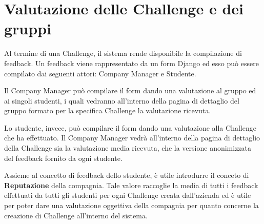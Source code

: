 \section{Valutazione delle Challenge e dei gruppi}
\label{sec:valutazioni}

Al termine di una Challenge, il sistema rende disponibile la compilazione di feedback. Un feedback viene rappresentato da un form Django ed esso può essere compilato dai seguenti attori: Company Manager e Studente. 

Il Company Manager può compilare il form dando una valutazione al gruppo ed ai singoli studenti, i quali vedranno all'interno della pagina di dettaglio del gruppo formato per la specifica Challenge la valutazione ricevuta.

Lo studente, invece, può compilare il form dando una valutazione alla Challenge che ha effettuato. Il Company Manager vedrà all'interno della pagina di dettaglio della Challenge sia la valutazione media ricevuta, che la versione anonimizzata del feedback fornito da ogni studente. 

Assieme al concetto di feedback dello studente, è utile introdurre il conceto di \textbf{Reputazione} della compagnia. Tale valore raccoglie la media di tutti i feedback effettuati da tutti gli studenti per ogni Challenge creata dall'azienda ed è utile per poter dare una valutazione oggettiva della compagnia per quanto concerne la creazione di Challenge all'interno del sistema.



\clearpage
